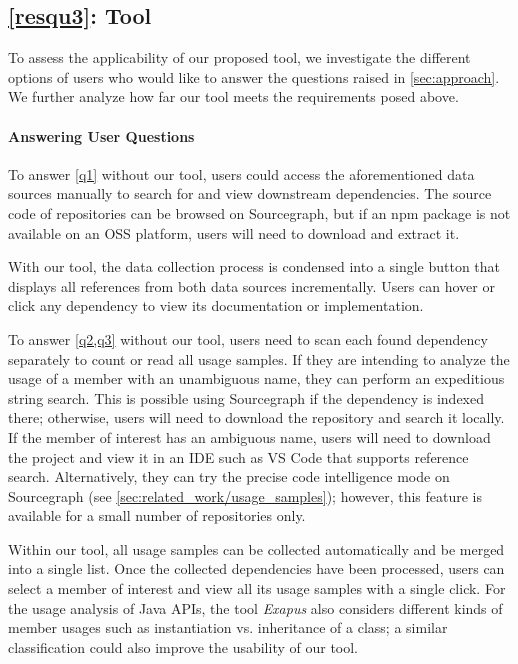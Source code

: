 \subsection{\ref{resqu3}: Tool}
\label{sec:evaluation/resqu3}

To assess the applicability of our proposed tool, we investigate the different options of users who would like to answer the questions raised in \cref{sec:approach}.
We further analyze how far our tool meets the requirements posed above.

\paragraph{Answering User Questions}

To answer \cref{q1} without our tool, users could access the aforementioned data sources manually to search for and view downstream dependencies.
The source code of repositories can be browsed on Sourcegraph, but if an npm package is not available on an OSS platform, users will need to download and extract it.

With our tool, the data collection process is condensed into a single button that displays all references from both data sources incrementally.
Users can hover or click any dependency to view its documentation or implementation.

To answer \cref{q2,q3} without our tool, users need to scan each found dependency separately to count or read all usage samples.
If they are intending to analyze the usage of a member with an unambiguous name, they can perform an expeditious string search.
This is possible using Sourcegraph if the dependency is indexed there; otherwise, users will need to download the repository and search it locally.
If the member of interest has an ambiguous name, users will need to download the project and view it in an IDE such as VS Code that supports reference search.
Alternatively, they can try the precise code intelligence mode on Sourcegraph (see \cref{sec:related_work/usage_samples}); however, this feature is available for a small number of repositories only.

Within our tool, all usage samples can be collected automatically and be merged into a single list.
Once the collected dependencies have been processed, users can select a member of interest and view all its usage samples with a single click.
For the usage analysis of Java APIs, the tool \emph{Exapus} \citep{de2013multi} also considers different kinds of member usages such as instantiation vs. inheritance of a class; a similar classification could also improve the usability of our tool.

